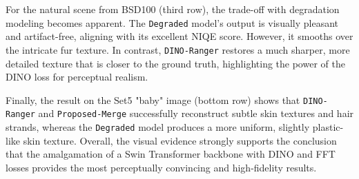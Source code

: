 \documentclass[10pt,twocolumn,letterpaper]{article}
\begin{document}
For the natural scene from BSD100 (third row), the trade-off with degradation modeling becomes apparent. The \texttt{Degraded} model's output is visually pleasant and artifact-free, aligning with its excellent NIQE score. However, it smooths over the intricate fur texture. In contrast, \texttt{DINO-Ranger} restores a much sharper, more detailed texture that is closer to the ground truth, highlighting the power of the DINO loss for perceptual realism.

Finally, the result on the Set5 "baby" image (bottom row) shows that \texttt{DINO-Ranger} and \texttt{Proposed-Merge} successfully reconstruct subtle skin textures and hair strands, whereas the \texttt{Degraded} model produces a more uniform, slightly plastic-like skin texture. Overall, the visual evidence strongly supports the conclusion that the amalgamation of a Swin Transformer backbone with DINO and FFT losses provides the most perceptually convincing and high-fidelity results.
\end{document}
